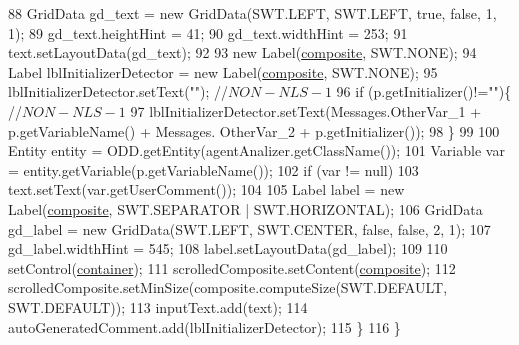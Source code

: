 \begin{DoxyCode}
88             GridData gd\_text = \textcolor{keyword}{new} GridData(SWT.LEFT, SWT.LEFT, \textcolor{keyword}{true}, \textcolor{keyword}{false}, 1, 1);
89             gd\_text.heightHint = 41;
90             gd\_text.widthHint = 253;
91             text.setLayoutData(gd\_text);
92 
93             \textcolor{keyword}{new} Label(\hyperlink{classit_1_1isislab_1_1masonhelperdocumentation_1_1mason_1_1wizards_1_1_f___agent_variables_page_a9b95e0b06f6e0d96b7497478df0e5960}{composite}, SWT.NONE);        
94             Label lblInitializerDetector = \textcolor{keyword}{new} Label(\hyperlink{classit_1_1isislab_1_1masonhelperdocumentation_1_1mason_1_1wizards_1_1_f___agent_variables_page_a9b95e0b06f6e0d96b7497478df0e5960}{composite}, SWT.NONE);
95             lblInitializerDetector.setText(\textcolor{stringliteral}{""}); \textcolor{comment}{//$NON-NLS-1$}
96             \textcolor{keywordflow}{if} (p.getInitializer()!=\textcolor{stringliteral}{""})\{ \textcolor{comment}{//$NON-NLS-1$}
97                 lblInitializerDetector.setText(Messages.OtherVar\_1 + p.getVariableName() + Messages.
      OtherVar\_2 + p.getInitializer());
98             \}
99             
100             Entity entity = ODD.getEntity(agentAnalizer.getClassName());
101             Variable var = entity.getVariable(p.getVariableName());
102             \textcolor{keywordflow}{if} (var != null)
103                 text.setText(var.getUserComment());
104             
105             Label label = \textcolor{keyword}{new} Label(\hyperlink{classit_1_1isislab_1_1masonhelperdocumentation_1_1mason_1_1wizards_1_1_f___agent_variables_page_a9b95e0b06f6e0d96b7497478df0e5960}{composite}, SWT.SEPARATOR | SWT.HORIZONTAL);
106             GridData gd\_label = \textcolor{keyword}{new} GridData(SWT.LEFT, SWT.CENTER, \textcolor{keyword}{false}, \textcolor{keyword}{false}, 2, 1);
107             gd\_label.widthHint = 545;
108             label.setLayoutData(gd\_label);
109             
110             setControl(\hyperlink{classit_1_1isislab_1_1masonhelperdocumentation_1_1mason_1_1wizards_1_1_f___agent_variables_page_aa9f4b2d9a3bfc361d12d8832f8f7e212}{container});
111             scrolledComposite.setContent(\hyperlink{classit_1_1isislab_1_1masonhelperdocumentation_1_1mason_1_1wizards_1_1_f___agent_variables_page_a9b95e0b06f6e0d96b7497478df0e5960}{composite});
112             scrolledComposite.setMinSize(composite.computeSize(SWT.DEFAULT, SWT.DEFAULT));  
113             inputText.add(text);
114             autoGeneratedComment.add(lblInitializerDetector);
115         \}
116     \}
\end{DoxyCode}



